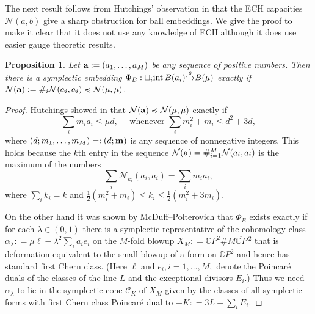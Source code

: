 \documentclass[11pt]{amsart}
\newcommand{\labell}[1] {\label{#1}}
\newcommand{\1}{{{\mathchoice {\rm 1\mskip-4mu l} {\rm 1\mskip-4mu l}
{\rm 1\mskip-4.5mu l} {\rm 1\mskip-5mu l}}}}
\newcommand{\ba} {{\bf a}}
\newcommand{\bm} {{\bf m}}
\newcommand{\intt}{{\rm int\,}}
\newcommand{\al}{{\alpha}}
\newcommand{\la}{{\lambda}}
\newcommand{\Cc}{{\mathcal C}}
\newcommand{\ov}{\overline}
\newcommand{\C}{{\mathbb C}}
\newcommand{\Nn}{{\mathcal N}}
\newcommand{\se} {{\stackrel{s}\hookrightarrow}}
\newtheorem{prop}[theorem]{Proposition}
\numberwithin{figure}{section}
\numberwithin{equation}{section}
\begin{document}
The next result follows from Hutchings' observation in 
\cite[Remark~1.10]{H} that the ECH capacities $\Nn(a,b)$ give a sharp obstruction for ball embeddings.  We give the proof to make it clear that it does not 
use any knowledge of ECH although it does use easier gauge theoretic  results.

\begin{prop}\labell{prop:H} \cite{H}
Let $\ba: = (a_1,\dots, a_M)$ be any sequence of positive numbers.  Then
there is a symplectic embedding  $\Phi_B:\sqcup_i \intt B(a_i)\se B(\mu)$ exactly if 
$\Nn(\ba): = \#_i \Nn(a_i,a_i)\preccurlyeq \Nn(\mu,\mu)$.
\end{prop}
 \begin{proof}   Hutchings showed in \cite[Proposition~1.9]{H}
 that $\Nn(\ba)\preccurlyeq \Nn(\mu,\mu)$ exactly if 
 \begin{equation}\labell{eq:ba}
 \sum_i m_ia_i\le \mu d, \quad \mbox{ whenever }
 \sum_i m_i^2 + m_i \le d^2 + 3d,
 \end{equation}
 where $(d;m_1,\dots,m_M)=: (d;\bm)$ is any sequence of nonnegative integers.
 This holds because
 the $k$th entry in the sequence 
 $\Nn(\ba)= \#_{i=1}^M \Nn(a_i,a_i)$ is the maximum of the numbers
 $$
 \sum_i\Nn_{k_i}(a_i,a_i) = \sum_i m_i a_i,
 $$ 
 where $\sum_i k_i = k$
 and $\frac 12 (m_i^2 + m_i) \le k_i\le \frac 12 (m_i^2 + 3m_i).$

On the other hand  it was shown by McDuff--Polterovich \cite{MP} that $\Phi_B$ exists exactly if for each $\la \in (0,1)$ there is a symplectic representative of the cohomology class $\al_\la: = \mu\ell -\la^2 \sum_ia_i e_i$ on the $M$-fold blowup 
$X_M: = \C P^2 \# M\ov{\C P}\,\!^2$ that is deformation equivalent to the small blowup of a form on $\C P^2$ and hence has standard first Chern class.  (Here $\ell$ and $e_i, i=1,\dots,M,$ denote
 the Poincar\'e duals of the classes of the line $L$ and the exceptional divisors $E_i$.)
Thus we need $\al_\la$ to lie
 in the symplectic cone $\Cc_K$ of $X_M$ given by the classes of all symplectic forms with first Chern class Poincar\'e dual to $-K: = 3L-\sum_iE_i$.  
 

\end{proof}
\end{document}
